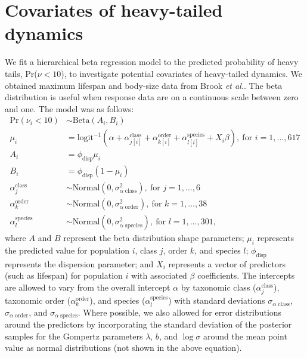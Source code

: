 \documentclass[12pt]{article}
\begin{document}
\section{Covariates of heavy-tailed dynamics} We fit a hierarchical beta regression model to the predicted probability of heavy tails, Pr(\(\nu < 10\)), to investigate potential covariates of heavy-tailed dynamics. We obtained maximum lifespan and body-size data from Brook \emph{et al.}\cite{brook2006a}. The beta distribution is useful when response data are on a continuous scale between zero and one\cite{ferrari2004}. The model was as follows:
\begin{align}
\mathrm{Pr}(\nu_i < 10) &\sim \mathrm{Beta}(A_i, B_i)\\
\mu_i &= \mathrm{logit}^{-1}(\alpha
  + \alpha^\mathrm{class}_{j[i]}
  + \alpha^\mathrm{order}_{k[i]}
  + \alpha^\mathrm{species}_{l[i]}
  + X_i \beta),
  \: \text{for } i = 1, \dots, 617\\
A_i &= \phi_\mathrm{disp} \mu_i\\
B_i &= \phi_\mathrm{disp} (1 - \mu_i)\\
\alpha^\mathrm{class}_j &\sim
  \mathrm{Normal}(0, \sigma^2_{\alpha \; \mathrm{class}}),
  \: \text{for } j = 1, \dots, 6\\
\alpha^\mathrm{order}_k &\sim
  \mathrm{Normal}(0, \sigma^2_{\alpha \; \mathrm{order}}),
  \: \text{for } k = 1, \dots, 38\\
\alpha^\mathrm{species}_l &\sim
  \mathrm{Normal}(0, \sigma^2_{\alpha \; \mathrm{species}}),
  \: \text{for } l = 1, \dots, 301,
\end{align}
where \(A\) and \(B\) represent the beta distribution shape parameters; \(\mu_i\) represents the predicted value for population \(i\), class \(j\), order \(k\), and species \(l\); \(\phi_\mathrm{disp}\) represents the dispersion parameter; and \(X_i\) represents a vector of predictors (such as lifespan) for population \(i\) with associated \(\beta\) coefficients. The intercepts are allowed to vary from the overall intercept \(\alpha\) by taxonomic class (\(\alpha^\mathrm{class}_j\)), taxonomic order (\(\alpha^\mathrm{order}_k\)), and species (\(\alpha^\mathrm{species}_l\)) with standard deviations \(\sigma_{\alpha \; \mathrm{class}}\), \(\sigma_{\alpha \; \mathrm{order}}\), and \(\sigma_{\alpha \; \mathrm{species}}\). Where possible, we also allowed for error distributions around the predictors by incorporating the standard deviation of the posterior samples for the Gompertz parameters \(\lambda\), \(b\), and \(\log \sigma\) around the mean point value as normal distributions (not shown in the above equation).
\end{document}
